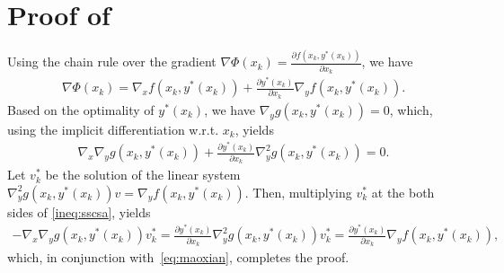 \documentclass{osudissert96}
\begin{document}
\section{Proof of~}
Using the chain rule over the gradient  $\nabla \Phi(x_k)=\frac{\partial f(x_k,y^*(x_k))}{\partial x_k}$, we have
\begin{align}\label{eq:maoxian}
\nabla \Phi(x_k)= \nabla_x f(x_k,y^*(x_k)) + \frac{\partial y^*(x_k)}{\partial x_k}\nabla_y f(x_k,y^*(x_k)).
\end{align}
Based on the optimality of $y^*(x_k)$, we have $\nabla_yg(x_k,y^*(x_k)) = 0$, which, using the implicit differentiation w.r.t. $x_k$, yields
\begin{align}\label{ineq:sscsa}  
\nabla_x\nabla_yg(x_k,y^*(x_k)) +\frac{\partial y^*(x_k)}{\partial x_k}\nabla_y^2g(x_k,y^*(x_k))= 0.
\end{align}
Let $v_k^*$ be the solution of the linear system $ \nabla_y^2g(x_k,y^*(x_k))v=\nabla_y f(x_k,y^*(x_k))$. Then, multiplying $v_k^*$ at the both sides of \cref{ineq:sscsa}, yields
\begin{align*}
-\nabla_x\nabla_yg(x_k,y^*(x_k)) v_k^* = \frac{\partial y^*(x_k)}{\partial x_k}\nabla_y^2g(x_k,y^*(x_k)) v_k^*=  \frac{\partial y^*(x_k)}{\partial x_k} \nabla_y f(x_k,y^*(x_k)),
\end{align*}
which, in conjunction with~\cref{eq:maoxian}, completes the proof.  
\end{document}
